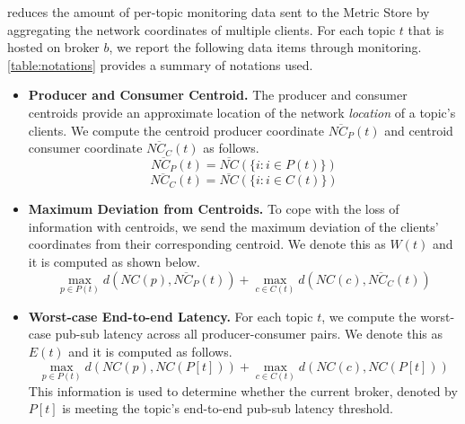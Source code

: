 \epulsar{} reduces the amount of per-topic monitoring data sent to the Metric Store by aggregating the network coordinates of multiple clients. For each topic $t$ that is hosted on broker $b$, we report the following data items through monitoring. \cref{table:notations} provides a summary of notations used.
\begin{itemize}
\item \textbf{Producer and Consumer Centroid.} The producer and consumer centroids provide an approximate location of the network \textit{location} of a topic's clients. We compute the centroid producer coordinate $\overline{NC_P}\left( t \right)$ and centroid consumer coordinate $\overline{NC_C}\left( t \right)$ as follows.
\begin{equation*}
\overline{NC_P}\left( t \right) = \overline{NC} \left( \{ i : i \in P\left( t \right) \} \right)
\end{equation*}
\begin{equation*}
\overline{NC_C}\left( t \right) = \overline{NC} \left( \{ i : i \in C\left( t \right) \} \right)
\end{equation*}
\item \textbf{Maximum Deviation from Centroids.} To cope with the loss of information with centroids, we send the maximum deviation of the clients' coordinates from their corresponding centroid. We denote this as $W \left( t \right)$ and it is computed as shown below.
\begin{equation*}
\max\limits_{p \in P\left( t \right)} d \left( NC \left( p\right), \overline{NC_P}\left( t \right)\right) + \max\limits_{c \in C\left( t \right)} d \left( NC \left( c\right), \overline{NC_C}\left( t \right)\right)
\end{equation*}
\item \textbf{Worst-case End-to-end Latency.} For each topic $t$, we compute the worst-case pub-sub latency across all producer-consumer pairs. We denote this as $E \left( t \right)$ and it is computed as follows. 
\begin{equation*}
\max\limits_{p \in P\left( t \right)} d \left( NC \left( p\right), NC\left( P\left[ t \right] \right) \right) + \max\limits_{c \in C\left( t \right)} d \left( NC \left( c\right), NC\left( P\left[ t \right] \right) \right) 
\end{equation*}
This information is used to determine whether the current broker, denoted by $P\left[ t \right]$ is meeting the topic's end-to-end pub-sub latency threshold.
\end{itemize}

